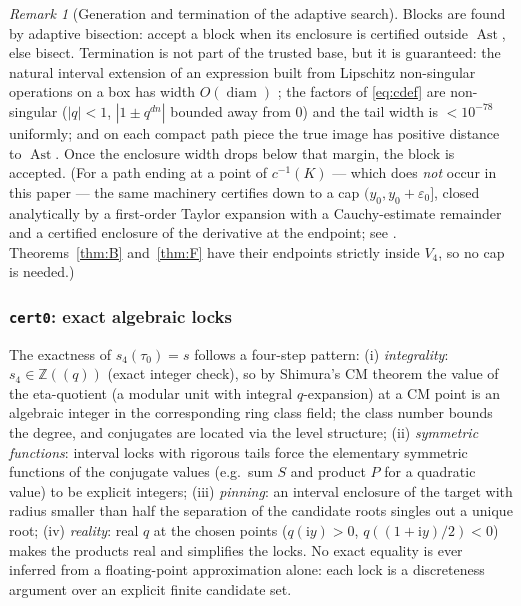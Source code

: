 \documentclass[11pt]{article}
\newcommand{\Zz}{\mathbb{Z}}
\newcommand{\ii}{\mathrm{i}}
\DeclareMathOperator{\Ast}{Ast}
\theoremstyle{definition}
\theoremstyle{remark}
\newtheorem{remark}[theorem]{Remark}
\begin{document}
\begin{remark}[Generation and termination of the adaptive search]
\label{rem:termin}
Blocks are found by adaptive bisection: accept a block when its
enclosure is certified outside $\Ast$, else bisect. Termination is
not part of the trusted base, but it is guaranteed: the natural
interval extension of an expression built from Lipschitz non-singular
operations on a box has width $O(\operatorname{diam})$ \cite{MoKC};
the factors of \eqref{eq:cdef} are non-singular ($|q|<1$,
$|1\pm q^{dn}|$ bounded away from $0$) and the tail width is
$<10^{-78}$ uniformly; and on each compact path piece the true image
has positive distance to $\Ast$. Once the enclosure width drops
below that margin, the block is accepted. (For a path ending at a
point of $c^{-1}(K)$ --- which does \emph{not} occur in this paper
--- the same machinery certifies down to a cap
$(y_0,y_0+\varepsilon_0]$, closed analytically by a first-order
Taylor expansion with a Cauchy-estimate remainder and a certified
enclosure of the derivative at the endpoint; see
\cite[\S4.3]{Zf}. Theorems~\ref{thm:B} and~\ref{thm:F} have their
endpoints strictly inside $V_4$, so no cap is needed.)
\end{remark}

\subsubsection{\texttt{cert0}: exact algebraic locks}\label{subsec:cert0}

The exactness of $s_4(\tau_0)=s$ follows a four-step pattern:
(i) \emph{integrality}: $s_4\in\Zz(\!(q)\!)$ (exact integer check),
so by Shimura's CM theorem \cite{Cox} the value of the eta-quotient
(a modular unit with integral $q$-expansion) at a CM point is an
algebraic integer in the corresponding ring class field; the class
number bounds the degree, and conjugates are located via the level
structure;
(ii) \emph{symmetric functions}: interval locks with rigorous tails
force the elementary symmetric functions of the conjugate values
(e.g.\ sum $S$ and product $P$ for a quadratic value) to be explicit
integers;
(iii) \emph{pinning}: an interval enclosure of the target with radius
smaller than half the separation of the candidate roots singles out a
unique root;
(iv) \emph{reality}: real $q$ at the chosen points
($q(\ii y)>0$, $q((1+\ii y)/2)<0$) makes the products real and
simplifies the locks.
No exact equality is ever inferred from a floating-point
approximation alone: each lock is a discreteness argument over an
explicit finite candidate set.
\end{document}

